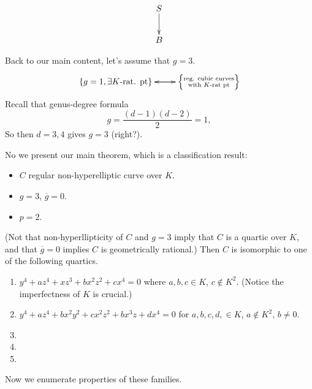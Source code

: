 $$
\xymatrix{
S\ar[d]\\
B
}
$$

\medskip\noindent
Back to our main content, let's assume that $g=3$.
$$
\xymatrix{
\{g=1,\exists K\text{-rat. pt}\}\ar[r]&\ar[l]
\left\{\substack{\text{reg. cubic curves} \\ \text{with $K$-rat pt}}\right\}
}
$$
Recall that genus-degree formula
$$
g=\frac{(d-1)(d-2)}{2}=1,
$$
So then $d=3,4$ gives  $g=3$ (right?).

No we present our main theorem, which is a classification result:

\begin{theorem}
\label{theorem-classification-quartics}
\begin{itemize}
\item $C$ regular non-hyperelliptic curve over $K$.
\item  $g=3$, $\overline{g}=0$.
\item $p=2$.
\end{itemize}
(Not that non-hyperllipticity of $C$ and $g=3$ imply that $C$ is a quartic
over $K$, and that  $\overline{g}=0$ implies $C$ is geometrically rational.)
Then $C$ is isomorphic to one of the following quartics.

\begin{enumerate}
\item $y^4+az^4+xz^3+bx^2z^2+cx^4=0$ where $a,b,c \in K$, $c \not \in K^2$.
(Notice the imperfectness of $K$ is crucial.)

\item $y^4+az^4+bx^2y^2+cx^2z^2+bx^3z+dx^4=0$ for $a,b,c,d, \in K$,
$a \not \in K^2$, $b\not =0$.

\item 
\item 
\item 
\end{enumerate}
\end{theorem}

\noindent
Now we enumerate properties of these families.


